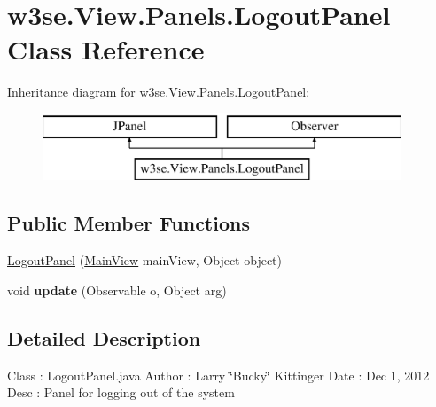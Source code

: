 \hypertarget{classw3se_1_1_view_1_1_panels_1_1_logout_panel}{\section{w3se.\-View.\-Panels.\-Logout\-Panel Class Reference}
\label{classw3se_1_1_view_1_1_panels_1_1_logout_panel}
}
Inheritance diagram for w3se.\-View.\-Panels.\-Logout\-Panel\-:\begin{figure}[H]
\begin{center}
\leavevmode
\includegraphics[height=2.000000cm]{classw3se_1_1_view_1_1_panels_1_1_logout_panel}
\end{center}
\end{figure}
\subsection*{Public Member Functions}
\begin{DoxyCompactItemize}
\item 
\hyperlink{classw3se_1_1_view_1_1_panels_1_1_logout_panel_af309c6ed63939f2e7c6e60ca71e89d3e}{Logout\-Panel} (\hyperlink{classw3se_1_1_view_1_1_main_view}{Main\-View} main\-View, Object object)
\item 
\hypertarget{classw3se_1_1_view_1_1_panels_1_1_logout_panel_a3d502b0a7e483c05f252a4e05752299a}{void {\bfseries update} (Observable o, Object arg)}\label{classw3se_1_1_view_1_1_panels_1_1_logout_panel_a3d502b0a7e483c05f252a4e05752299a}

\end{DoxyCompactItemize}


\subsection{Detailed Description}
Class \-: Logout\-Panel.\-java Author \-: Larry \char`\"{}\-Bucky\char`\"{} Kittinger Date \-: Dec 1, 2012 Desc \-: Panel for logging out of the system 

